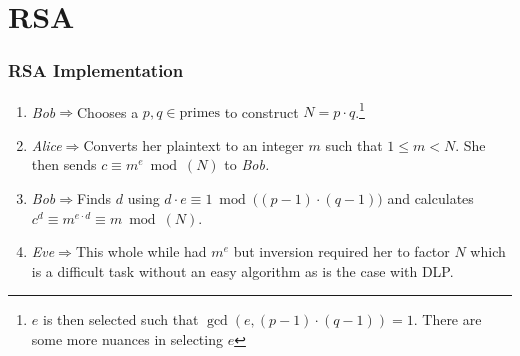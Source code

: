 \documentclass[11pt]{beamer}
\begin{document}
\section{RSA}
  \begin{frame}
    \frametitle{RSA Implementation}
    \begin{enumerate}
      \item \emph{Bob}\(\Rightarrow\)Chooses a $p,q\in \text{primes}$ to construct \(N= p \cdot q\).\footnote{\(e\) is then selected such that \(\gcd(e, (p-1)\cdot (q-1))=1\). There are some more nuances in selecting \(e\)}\pause
      \item \emph{Alice}\(\Rightarrow\)Converts her plaintext to an integer \(m\) such that \(1\leq m<N\). She then sends \(c \equiv m^e \bmod(N)\) to \emph{Bob.}\pause
      \item \emph{Bob}\(\Rightarrow\)Finds \(d\) using \(d\cdot e \equiv 1 \bmod\big((p-1)\cdot (q-1)\big)\) and calculates \(c^d \equiv m^{e\cdot d}\equiv m \bmod(N)\).\pause
      \item \emph{Eve}$\Rightarrow$This whole while had $m^e$ but inversion required her to factor \(N\) which is a difficult task without an easy algorithm as is the case with DLP.
    \end{enumerate}
  \end{frame}

  \begin{frame}
    \Large {}
  \end{frame}
\end{document}
